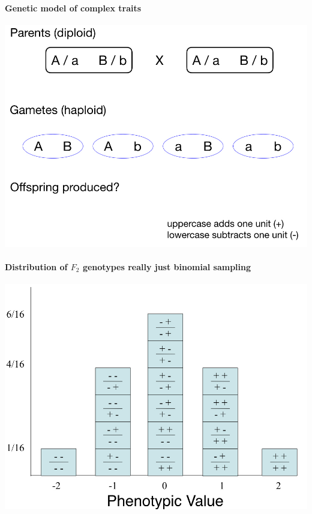 \documentclass[
]{book}
\begin{document}
\hypertarget{genetic-model-of-complex-traits}{%
\paragraph{Genetic model of complex traits}\label{genetic-model-of-complex-traits}}

\begin{center}\includegraphics[width=0.9\linewidth]{images/week_2.017} \end{center}

\hypertarget{distribution-of-f_2-genotypes-really-just-binomial-sampling}{%
\paragraph{\texorpdfstring{Distribution of \(F_2\) genotypes \textbar{} really just binomial sampling}{Distribution of F\_2 genotypes \textbar{} really just binomial sampling}}\label{distribution-of-f_2-genotypes-really-just-binomial-sampling}}

\begin{center}\includegraphics[width=0.7\linewidth]{images/week_2.018} \end{center}
\end{document}
